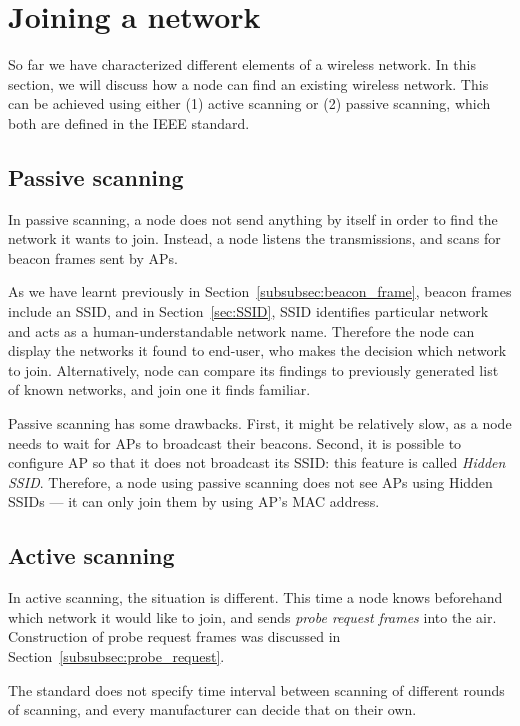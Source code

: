 \documentclass[12pt,a4paper,oneside,pdftex]{report}
\begin{document}
\section{Joining a network}
\label{sec:joining}

So far we have characterized different elements of a wireless network. In this section, we will discuss how a node can find an existing wireless network. This can be achieved using either (1) active scanning or (2) passive scanning, which both are defined in the IEEE standard.~\cite{IEEE802.11_scanning}

\subsection{Passive scanning}
\label{subsec:passive_scanning}

In passive scanning, a node does not send anything by itself in order to find the network it wants to join. Instead, a node listens the transmissions, and scans for beacon frames sent by APs.

As we have learnt previously in Section~\ref{subsubsec:beacon_frame}, beacon frames include an SSID, and in Section~\ref{sec:SSID}, SSID identifies particular network and acts as a human-understandable network name. Therefore the node can display the networks it found to end-user, who makes the decision which network to join. Alternatively, node can compare its findings to previously generated list of known networks, and join one it finds familiar.

Passive scanning has some drawbacks. First, it might be relatively slow, as a node needs to wait for APs to broadcast their beacons. Second, it is possible to configure AP so that it does not broadcast its SSID: this feature is called \emph{Hidden SSID}. Therefore, a node using passive scanning does not see APs using Hidden SSIDs --- it can only join them by using AP's MAC address.

\subsection{Active scanning}
\label{subsec:active_scanning}

In active scanning, the situation is different. This time a node knows beforehand which network it would like to join, and sends \emph{probe request frames} into the air. Construction of probe request frames was discussed in Section~\ref{subsubsec:probe_request}.

The standard does not specify time interval between scanning of different rounds of scanning, and every manufacturer can decide that on their own.  
\end{document}
